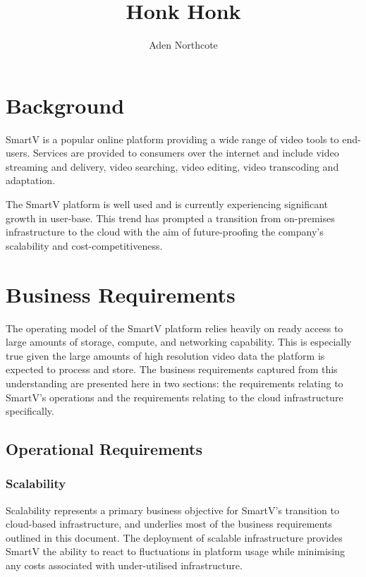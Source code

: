 \documentclass[]{article}
\title{Honk Honk}
\author{Aden Northcote}
\date{}
\begin{document}
    
\maketitle

\tableofcontents

\clearpage

\section{Background}

SmartV is a popular online platform providing a wide range of video tools to end-users. Services are provided to consumers over the internet and include video streaming and delivery, video searching, video editing, video transcoding and adaptation.

The SmartV platform is well used and is currently experiencing significant growth in user-base. This trend has prompted a transition from on-premises infrastructure to the cloud with the aim of future-proofing the company's scalability and cost-competitiveness.

\section{Business Requirements}

The operating model of the SmartV platform relies heavily on ready access to large amounts of storage, compute, and networking capability. This is especially true given the large amounts of high resolution video data the platform is expected to process and store. The business requirements captured from this understanding are presented here in two sections: the requirements relating to SmartV's operations and the requirements relating to the cloud infrastructure specifically.

\subsection{Operational Requirements}

\subsubsection{Scalability}

Scalability represents a primary business objective for SmartV's transition to cloud-based infrastructure, and underlies most of the business requirements outlined in this document. The deployment of scalable infrastructure provides SmartV the ability to react to fluctuations in platform usage while minimising any costs associated with under-utilised infrastructure.
\end{document}
